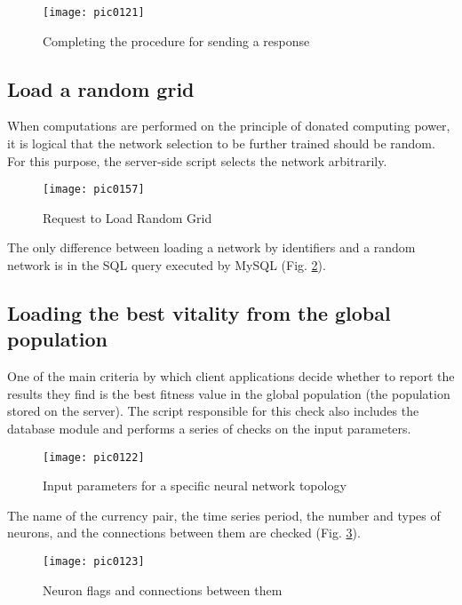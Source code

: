 \begin{figure}[h]
\centering
\texttt{[image: pic0121]}
\caption{Completing the procedure for sending a response}
\label{fig:pic0121}
\end{figure}
\FloatBarrier

\subsection{Load a random grid}

When computations are performed on the principle of donated computing power, it is logical that the network selection to be further trained should be random. For this purpose, the server-side script selects the network arbitrarily.

\begin{figure}[h]
\centering
\texttt{[image: pic0157]}
\caption{Request to Load Random Grid}
\label{fig:pic0157}
\end{figure}
\FloatBarrier

The only difference between loading a network by identifiers and a random network is in the SQL query executed by MySQL (Fig. \ref{fig:pic0157}).

\subsection{Loading the best vitality from the global population}

One of the main criteria by which client applications decide whether to report the results they find is the best fitness value in the global population (the population stored on the server). The script responsible for this check also includes the database module and performs a series of checks on the input parameters.

\begin{figure}[h]
\centering
\texttt{[image: pic0122]}
\caption{Input parameters for a specific neural network topology}
\label{fig:pic0122}
\end{figure}
\FloatBarrier

The name of the currency pair, the time series period, the number and types of neurons, and the connections between them are checked (Fig. \ref{fig:pic0122}).

\begin{figure}[h]
\centering
\texttt{[image: pic0123]}
\caption{Neuron flags and connections between them}
\label{fig:pic0123}
\end{figure}
\FloatBarrier

